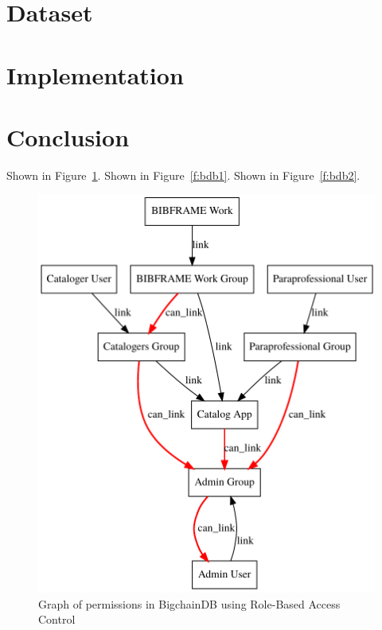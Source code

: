 \section{Dataset}

\section{Implementation}


\section{Conclusion}








Shown in Figure~\ref{f:rbac}. 
Shown in Figure~\ref{f:bdb1}. 
Shown in Figure~\ref{f:bdb2}.


\begin{figure}[!htb]
	\centering\includegraphics[width=\columnwidth]{images/rbac-graph.pdf}  
	\caption{Graph of permissions in BigchainDB using Role-Based Access 
	Control}\label{f:rbac}
\end{figure}

